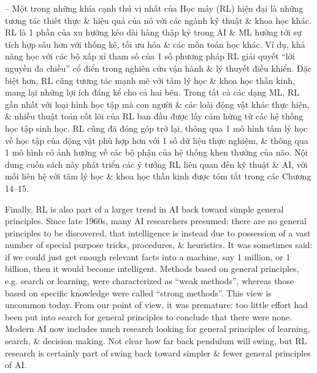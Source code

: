 \documentclass{article}
\begin{document}
\begin{itemize}
\begin{itemize}
        -- Một trong những khía cạnh thú vị nhất của Học máy (RL) hiện đại là những tương tác thiết thực \& hiệu quả của nó với các ngành kỹ thuật \& khoa học khác. RL là 1 phần của xu hướng kéo dài hàng thập kỷ trong AI \& ML hướng tới sự tích hợp sâu hơn với thống kê, tối ưu hóa \& các môn toán học khác. Ví dụ, khả năng học với các bộ xấp xỉ tham số của 1 số phương pháp RL giải quyết ``lời nguyền đa chiều'' cổ điển trong nghiên cứu vận hành \& lý thuyết điều khiển. Đặc biệt hơn, RL cũng tương tác mạnh mẽ với tâm lý học \& khoa học thần kinh, mang lại những lợi ích đáng kể cho cả hai bên. Trong tất cả các dạng ML, RL gần nhất với loại hình học tập mà con người \& các loài động vật khác thực hiện, \& nhiều thuật toán cốt lõi của RL ban đầu được lấy cảm hứng từ các hệ thống học tập sinh học. RL cũng đã đóng góp trở lại, thông qua 1 mô hình tâm lý học về học tập của động vật phù hợp hơn với 1 số dữ liệu thực nghiệm, \& thông qua 1 mô hình có ảnh hưởng về các bộ phận của hệ thống khen thưởng của não. Nội dung cuốn sách này phát triển các ý tưởng RL liên quan đến kỹ thuật \& AI, với mối liên hệ với tâm lý học \& khoa học thần kinh được tóm tắt trong các Chương 14--15.

        Finally, RL is also part of a larger trend in AI back toward simple general principles. Since late 1960s, many AI researchers presumed: there are no general principles to be discovered, that intelligence is instead due to possession of a vast number of special purpose tricks, procedures, \& heuristics. It was sometimes said: if we could just get enough relevant facts into a machine, say 1 million, or 1 billion, then it would become intelligent. Methods based on general principles, e.g. search or learning, were characterized as ``weak methods'', whereas those based on specific knowledge were called ``strong methods''. This view is uncommon today. From our point of view, it was premature: too little effort had been put into search for general principles to conclude that there were none. Modern AI now includes much research looking for general principles of learning, search, \& decision making. Not clear how far back pendulum will swing, but RL research is certainly part of swing back toward simpler \& fewer general principles of AI.


\end{itemize}
\end{itemize}
\end{document}
